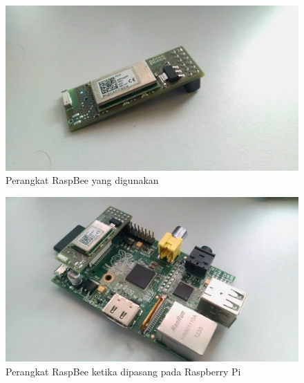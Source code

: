 \begin{figure}
	\centering
	\includegraphics[width=.9\textwidth]{pics/raspbee.jpg}
	\caption{Perangkat RaspBee yang digunakan}
	\label{fig:raspbee}
\end{figure}
\begin{figure}
	\centering
	\includegraphics[width=.9\textwidth]{pics/raspberry+raspbee.jpg}
	\caption{Perangkat RaspBee ketika dipasang pada Raspberry Pi}
	\label{fig:raspbeeraspberry}
\end{figure}


